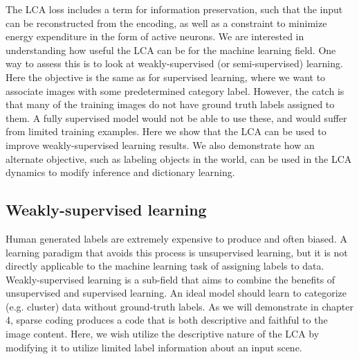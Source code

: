 The LCA loss includes a term for information preservation, such that the input can be reconstructed from the encoding, as well as a constraint to minimize energy expenditure in the form of active neurons.
We are interested in understanding how useful the LCA can be for the machine learning field.
One way to assess this is to look at weakly-supervised (or semi-supervised) learning. Here the objective is the same as for supervised learning, where we want to associate images with some predetermined category label.
However, the catch is that many of the training images do not have ground truth labels assigned to them.
A fully supervised model would not be able to use these, and would suffer from limited training examples.
Here we show that the LCA can be used to improve weakly-supervised learning results.
We also demonstrate how an alternate objective, such as labeling objects in the world, can be used in the LCA dynamics to modify inference and dictionary learning.

\subsection{Weakly-supervised learning}

Human generated labels are extremely expensive to produce and often biased.
A learning paradigm that avoids this process is unsupervised learning, but it is not directly applicable to the machine learning task of assigning labels to data.
Weakly-supervised learning is a sub-field that aims to combine the benefits of unsupervised and supervised learning.
An ideal model should learn to categorize (e.g. cluster) data without ground-truth labels.
As we will demonstrate in chapter 4, sparse coding produces a code that is both descriptive and faithful to the image content. %
Here, we wish utilize the descriptive nature of the LCA by modifying it to utilize limited label information about an input scene.

